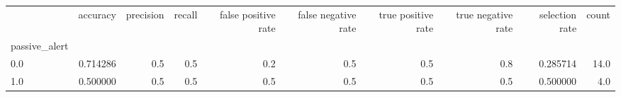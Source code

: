\begin{tabular}{lrrrrrrrrr}
\toprule
{} &  accuracy &  precision &  recall &  false positive rate &  false negative rate &  true positive rate &  true negative rate &  selection rate &  count \\
passive\_alert &           &            &         &                      &                      &                     &                     &                 &        \\
\midrule
0.0           &  0.714286 &        0.5 &     0.5 &                  0.2 &                  0.5 &                 0.5 &                 0.8 &        0.285714 &   14.0 \\
1.0           &  0.500000 &        0.5 &     0.5 &                  0.5 &                  0.5 &                 0.5 &                 0.5 &        0.500000 &    4.0 \\
\bottomrule
\end{tabular}
